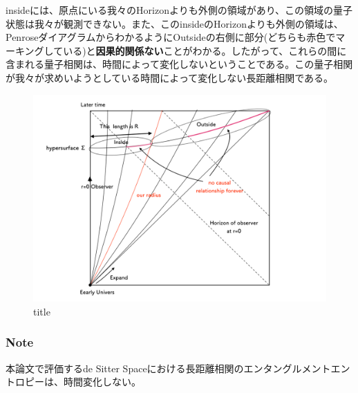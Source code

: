 insideには、原点にいる我々のHorizonよりも外側の領域があり、この領域の量子状態は我々が観測できない。また、このinsideのHorizonよりも外側の領域は、PenroseダイアグラムからわかるようにOutsideの右側に部分(どちらも赤色でマーキングしている)と{\bf 因果的関係ない}ことがわかる。したがって、これらの間に含まれる量子相関は、時間によって変化しないということである。この量子相関が我々が求めいようとしている時間によって変化しない長距離相関である。
\begin{figure}[H]
  \begin{center}
  \includegraphics[width=16cm,angle=0]{entanglesurface.pdf}
  \caption{title}
  \end{center}
\end{figure}

\begin{empheqboxed}
\subsubsection{Note}

本論文で評価するde Sitter Spaceにおける長距離相関のエンタングルメントエントロピーは、時間変化しない。
\end{empheqboxed}


